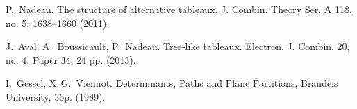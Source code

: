 \documentclass[11pt]{article}
\numberwithin{equation}{section}
\theoremstyle{plain}
\theoremstyle{definition}
\theoremstyle{remark}
\begin{document}
\begin{thebibliography}{99}
 P.~Nadeau. The structure of alternative tableaux. J. Combin. Theory
Ser. A 118, no. 5, 1638--1660 (2011).

 J.~Aval, A.~Boussicault, P.~Nadeau. Tree-like tableaux. Electron. J. Combin. 20, no. 4, Paper 34, 24 pp. (2013).

 I.~Gessel, X.\,G.~Viennot. Determinants, Paths and Plane Partitions, Brandeis University, 36p. (1989).




\end{thebibliography}
 
\end{document}
